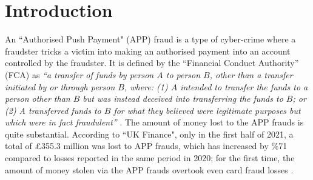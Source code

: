 

\section{Introduction}

An ``Authorised Push Payment" (APP) fraud is a type of cyber-crime where a fraudster tricks a victim into making an authorised payment into an account controlled by the fraudster. It is defined by the ``Financial Conduct Authority” (FCA) as \textit{``a transfer of funds by person $A$ to person $B$, other than a transfer initiated by or through person $B$, where: (1) $A$ intended to transfer the funds to a person other than $B$ but was instead deceived into transferring the funds to $B$; or (2) A transferred funds to $B$ for what they believed were legitimate purposes but which were in fact fraudulent''} \cite{FCA-Glossary}. The amount of money lost to the APP frauds is quite  substantial. According to  ``UK Finance",   only in the first half of 2021, a total of £355.3 million was lost to APP frauds, which has increased by  \%71  compared to losses reported in the same period in 2020; for the first time, the amount of money stolen via the APP frauds overtook even   card fraud losses \cite{2021-Half-Year-Fraud-Update}.



